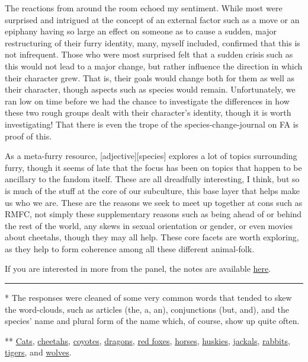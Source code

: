 The reactions from around the room echoed my sentiment. While most were
surprised and intrigued at the concept of an external factor such as a
move or an epiphany having so large an effect on someone as to cause a
sudden, major restructuring of their furry identity, many, myself
included, confirmed that this is not infrequent. Those who were most
surprised felt that a sudden crisis such as this would not lead to a
major change, but rather influence the direction in which their
character grew. That is, their goals would change both for them as well
as their character, though aspects such as species would remain.
Unfortunately, we ran low on time before we had the chance to
investigate the differences in how these two rough groups dealt with
their character's identity, though it is worth investigating! That there
is even the trope of the species-change-journal on FA is proof of this.

As a meta-furry resource, {[}adjective{]}{[}species{]} explores a lot of
topics surrounding furry, though it seems of late that the focus has
been on topics that happen to be ancillary to the fandom itself. These
are all dreadfully interesting, I think, but so is much of the stuff at
the core of our subculture, this base layer that helps make us who we
are. These are the reasons we seek to meet up together at cons such as
RMFC, not simply these supplementary reasons such as being ahead of or
behind the rest of the world, any skews in sexual orientation or gender,
or even movies about cheetahs, though they may all help. These core
facets are worth exploring, as they help to form coherence among all
these different animal-folk.

If you are interested in more from the panel, the notes are available
\href{https://github.com/adjspecies/roundtables-and-discussions/blob/master/species-identity-and-character-creation/notes-RMFC2013-20130804.markdown}{here}.

\begin{center}\rule{0.5\linewidth}{\linethickness}\end{center}

* The responses were cleaned of some very common words that tended to
skew the word-clouds, such as articles (the, a, an), conjunctions (but,
and), and the species' name and plural form of the name which, of
course, show up quite often.

** \href{http://adjectivespecies.com/?attachment_id=1444}{Cats},
\href{http://adjectivespecies.com/?attachment_id=1445}{cheetahs},
\href{http://adjectivespecies.com/?attachment_id=1452}{coyotes},
\href{http://adjectivespecies.com/?attachment_id=1446}{dragons},
\href{http://adjectivespecies.com/?attachment_id=1447}{red foxes},
\href{http://adjectivespecies.com/?attachment_id=1466}{horses},
\href{http://adjectivespecies.com/?attachment_id=1448}{huskies},
\href{http://adjectivespecies.com/?attachment_id=1449}{jackals},
\href{http://adjectivespecies.com/?attachment_id=1453}{rabbits},
\href{http://adjectivespecies.com/?attachment_id=1450}{tigers}, and
\href{http://adjectivespecies.com/?attachment_id=1451}{wolves}.

